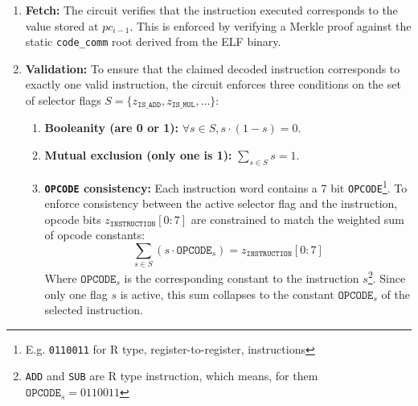 \begin{enumerate}
	\item \textbf{Fetch:} The circuit verifies that the
	      instruction executed corresponds to the value stored at $pc_{i-1}$.
	      This is enforced by verifying a Merkle proof against the static
	      \texttt{code\_comm} root derived from the ELF binary.

	\item \textbf{Validation:} To ensure that the claimed decoded instruction
	      corresponds to exactly one valid instruction, the circuit enforces
	      three conditions on the set of selector flags $S = \{z_{\texttt{IS\_ADD}}, z_{\texttt{IS\_MUL}}, \dots\}$:

	      \begin{enumerate}
		      \item \textbf{Booleanity (are 0 or 1):} $\forall s \in S, s \cdot (1-s) = 0$.

		      \item \textbf{Mutual exclusion (only one is 1):} $\sum_{s \in S} s = 1$.

		      \item \textbf{\texttt{OPCODE} consistency:} Each instruction word contains a 7 bit
		            \texttt{OPCODE}\footnote{E.g. \texttt{0110011} for R type,
			            register-to-register, instructions}. To enforce consistency
		            between the active selector flag and the instruction, opcode
		            bits $z_{\texttt{INSTRUCTION}}[0:7]$ are constrained to
		            match the weighted sum of opcode constants:
		            \begin{equation}
			            \sum_{s \in S} (s \cdot \texttt{OPCODE}_s) = z_{\texttt{INSTRUCTION}}[0:7]
		            \end{equation}
		            Where $\texttt{OPCODE}_s$ is the corresponding constant to the
		            instruction $s$\footnote{\texttt{ADD} and \texttt{SUB} are R type instruction,
			            which means, for them $\texttt{OPCODE}_s = 0110011$}.
		            Since only one flag $s$ is active, this sum collapses to the
		            constant $\texttt{OPCODE}_s$ of the selected instruction.


\end{enumerate}
\end{enumerate}
